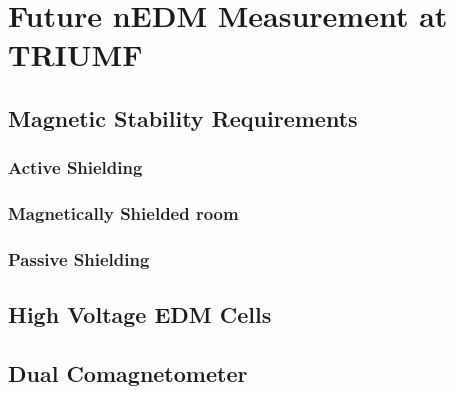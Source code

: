 \chapter{Future nEDM Measurement at TRIUMF}




\section{Magnetic Stability Requirements}
\subsection{Active Shielding}

\subsection{Magnetically Shielded room}

\subsection{Passive Shielding}


\section{High Voltage EDM Cells}

\section{Dual Comagnetometer}



